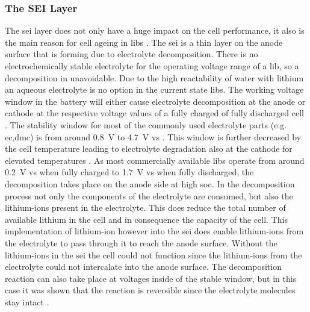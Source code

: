 \subsubsection{The SEI Layer}
\label{seilayer}
The \gls{sei} layer does not only have a huge impact on the cell performance, it also is the main reason for cell ageing in \glspl{lib} \cite{Vetter.2005}. The \gls{sei} is a thin layer on the anode surface that is forming due to electrolyte decomposition. There is no electrochemically stable electrolyte for the operating voltage range of a \gls{lib}, so a decomposition in unavoidable. Due to the high reactability of water with lithium an aqueous electrolyte is no option in the current state \glspl{lib}. The working voltage window in the battery will either cause electrolyte decomposition at the anode or cathode at the respective voltage values of a fully charged of fully discharged cell \cite{Wang.2018, Lin.2016}. The stability window for most of the commonly used electrolyte parts (e.g. \gls{ec},\gls{dmc}) is from around \SI{0.8}{\volt}  to \SI{4.7}{\volt} vs  \cite{Goodenough.2010,Palacin.2018}. This window is further decreased by the cell temperature leading to electrolyte degradation also at the cathode for elevated temperatures \cite{Shikano.2007,Rahman.2007}. As most commercially available \glspl{lib} operate from around \SI{0.2}{\volt} vs  when fully charged to \SI{1.7}{\volt} vs  when fully discharged, the decomposition takes place on the anode side at high \gls{soc}. In the decomposition process not only the components of the electrolyte are consumed, but also the lithium-ions present in the electrolyte. This does reduce the total number of available lithium in the cell and in consequence the capacity of the cell. This implementation of lithium-ion however into the \gls{sei} does enable lithium-ions from the electrolyte to pass through it to reach the anode surface. Without the lithium-ions in the \gls{sei} the cell could not function since the lithium-ions from the electrolyte could not intercalate into the anode surface. The decomposition reaction can also take place at voltages inside of the stable window, but in this case it was shown that the reaction is reversible since the electrolyte molecules stay intact \cite{Seidl.2016}. \par

